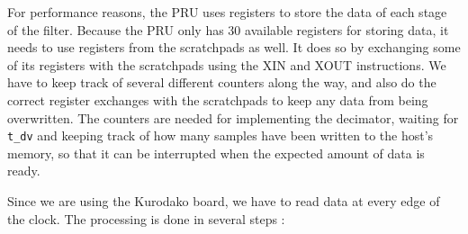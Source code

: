 \documentclass[]{report}
\begin{document}
For performance reasons, the PRU uses registers to store the data of each stage of the filter. Because the PRU only has 30 available registers for storing data, it needs to use registers from the scratchpads as well. It does so by exchanging some of its registers with the scratchpads using the XIN and XOUT instructions. We have to keep track of several different counters along the way, and also do the correct register exchanges with the scratchpads to keep any data from being overwritten. The counters are needed for implementing the decimator, waiting for \texttt{t\_dv} and keeping track of how many samples have been written to the host's memory, so that it can be interrupted when the expected amount of data is ready.

Since we are using the Kurodako board, we have to read data at every edge
of the clock. The processing is done in several steps :
\end{document}
